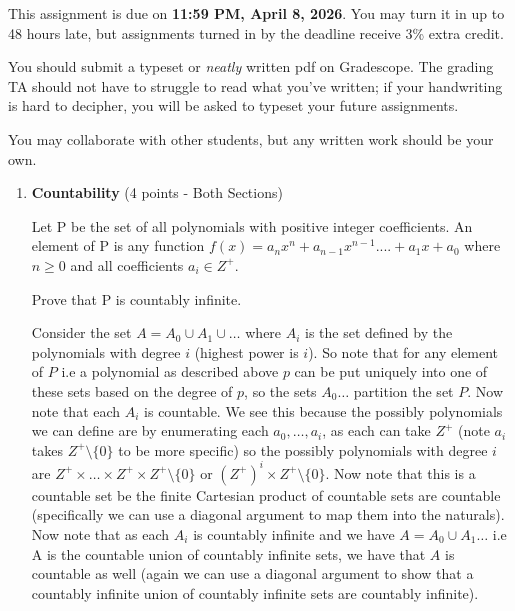 \documentclass[11pt]{article}
\begin{document}

This assignment is due on \textbf{11:59 PM, April 8, 2026}. You may turn it in up to 48 hours late, but assignments turned in by the deadline receive 3\% extra credit.

You should submit a typeset or \emph{neatly} written pdf on Gradescope.  The grading TA should not have to struggle to read what you've written; if your handwriting is hard to decipher, you will be asked to typeset your future assignments.

You may collaborate with other students, but any written work should be your own. 

\begin{enumerate}
    
\item \textbf{Countability} (4 points - Both Sections)

Let P be the set of all polynomials with positive integer coefficients. An element of P is any function $f(x)=a_nx^n + a_{n-1}x^{n-1} .... + a_1x + a_0$ 
where $ n \geq 0 $   and all coefficients $a_i \in Z^+$.

Prove that P is countably infinite. \\
\begin{answer}
    Consider the set $A = A_{0} \cup A_{1} \cup \dots$ where $A_{i}$ is the set defined by the polynomials with degree $i$ (highest power is $i$). So note that for any element of $P$ i.e a polynomial as described above $p$ can be put uniquely into one of these sets based on the degree of $p$, so the sets $A_{0} \dots $ partition the set $P$. Now note that each $A_i$ is countable. We see this because the possibly polynomials we can define  are by enumerating each $a_0, \dots, a_i$, as each can take $Z^{+}$ (note $a_i$ takes $Z^{+} \setminus \{0\}$ to be more specific) so the possibly polynomials with degree $i$ are $Z^{+} \times \dots \times Z^{+} \times Z^{+} \setminus \{0\}$ or $(Z^{+})^{i} \times Z^{+} \setminus \{0\}$. Now note that this is a countable set be the finite Cartesian product of countable sets are countable (specifically we can use a diagonal argument to map them into the naturals). Now note that as each $A_i$ is countably infinite and we have $A = A_{0} \cup A_{1} \dots$ i.e A is the countable union of countably infinite sets, we have that $A$ is countable as well (again we can use a diagonal argument to show that a countably infinite union of countably infinite sets are countably infinite).
\end{answer}


\end{enumerate}
\end{document}
